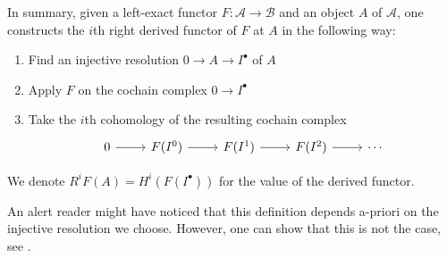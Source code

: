 In summary, given a left-exact functor $F:\mathcal{A}\to
\mathcal{B}$ and an object $A$ of $\mathcal{A}$, one constructs the $i$th
right derived functor of $F$ at $A$ in the following way:
\begin{enumerate}
  \item Find an injective resolution $0\to A\to I^{\bullet}$ of $A$
  \item Apply $F$ on the cochain complex $0\to I^{\bullet}$
  \item Take the $i$th cohomology of the resulting cochain complex
        \[\begin{tikzcd}
            0\rar & F(I^{0})\rar & F(I^{1})\rar
            & F(I^{2})\rar & \cdots
          \end{tikzcd}\]
\end{enumerate}
We denote $R^{i}F(A)=H^{i}(F(I^{\bullet}))$ for the value of the
derived functor.
\begin{lwarn}
  An alert reader might have noticed that this definition depends a-priori
  on the injective resolution we choose. However, one can show that this is
  not the case, see \cite{vakil}.
\end{lwarn}
